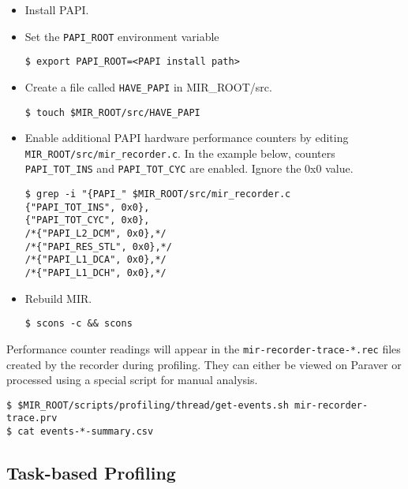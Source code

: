 \documentclass[11pt,a4paper]{article}
\begin{document}
\begin{itemize}
\item Install PAPI.
\item Set the \texttt{PAPI\_ROOT} environment variable

\begin{lstlisting}[style=MyInputStyle]
$ export PAPI_ROOT=<PAPI install path>
\end{lstlisting}

\item Create a file called \texttt{HAVE\_PAPI} in MIR\_ROOT/src.

\begin{lstlisting}[style=MyInputStyle]
$ touch $MIR_ROOT/src/HAVE_PAPI
\end{lstlisting}

\item Enable additional PAPI hardware performance counters by editing \texttt{MIR\_ROOT/src/mir\_recorder.c}. In the example below, counters \\ \texttt{PAPI\_TOT\_INS} and \texttt{PAPI\_TOT\_CYC} are enabled. Ignore the 0x0 value.

\begin{lstlisting}[style=MyInputStyle]
$ grep -i "{PAPI_" $MIR_ROOT/src/mir_recorder.c
{"PAPI_TOT_INS", 0x0},
{"PAPI_TOT_CYC", 0x0},
/*{"PAPI_L2_DCM", 0x0},*/
/*{"PAPI_RES_STL", 0x0},*/
/*{"PAPI_L1_DCA", 0x0},*/
/*{"PAPI_L1_DCH", 0x0},*/
\end{lstlisting}

\item Rebuild MIR.

\begin{lstlisting}[style=MyInputStyle]
$ scons -c && scons
\end{lstlisting}
\end{itemize}

Performance counter readings will appear in the \texttt{mir-recorder-trace-*.rec} files created by the recorder during profiling. They can either be viewed on Paraver or processed using a special script for manual analysis.

\begin{lstlisting}[style=MyInputStyle]
$ $MIR_ROOT/scripts/profiling/thread/get-events.sh mir-recorder-trace.prv
$ cat events-*-summary.csv
\end{lstlisting}

\subsection{Task-based Profiling}\label{task-based-profiling}
\end{document}
